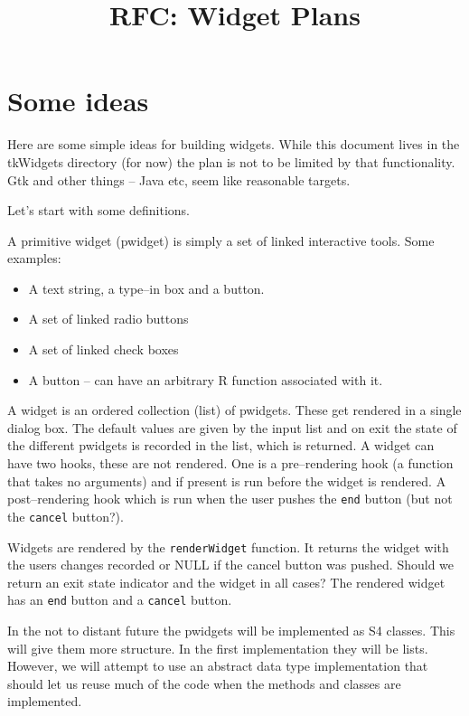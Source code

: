 \documentclass{article}
\begin{document}
\title{RFC: Widget Plans}
\maketitle


\section*{Some ideas}

Here are some simple ideas for building widgets. While this document
lives in the tkWidgets directory (for now) the plan is not to be
limited by that functionality. Gtk and other things -- Java etc,
seem like reasonable targets.

Let's start with some definitions.

A primitive widget (pwidget) is simply a set of linked interactive
tools.
Some examples:
\begin{itemize}
\item A text string, a type--in box and a button.
\item A set of linked radio buttons
\item A set of linked check boxes
\item A button -- can have an arbitrary R function associated with it.
\end{itemize}

A widget is an ordered collection (list) of pwidgets.
These get rendered in a single dialog box.
The default values are given by the input list and on exit the state
of the different pwidgets is recorded in the list, which is returned.
A widget can have two hooks, these are not rendered. One is a
pre--rendering hook (a function that takes no arguments) and if
present is run before the widget is rendered.
A post--rendering hook which is run when the user pushes the
\verb+end+ button (but not the \verb+cancel+ button?).

Widgets are rendered by the \verb+renderWidget+ function.
It returns the widget with
the users changes recorded or NULL if the cancel button was pushed.
Should we return an exit state indicator and the widget in all cases?
The rendered widget has an \verb+end+ button and a \verb+cancel+
button.

In the not to distant future the pwidgets will be implemented as S4
classes. This will give them more structure. In the first
implementation they will be lists. However, we will attempt to use an
abstract data type implementation that should let us reuse much of the
code when the methods and classes are implemented.
\end{document}
